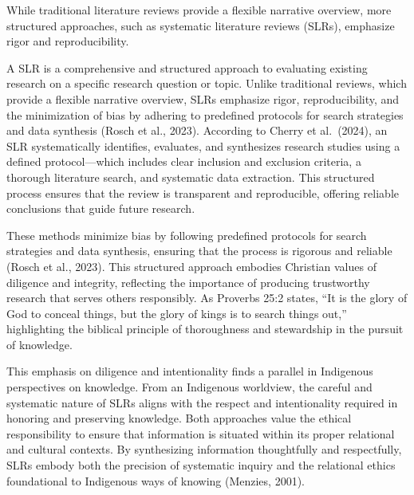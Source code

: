 \documentclass[
  letterpaper,
  DIV=11,
  numbers=noendperiod]{scrreprt}
\begin{document}

While traditional literature reviews provide a flexible narrative
overview, more structured approaches, such as systematic literature
reviews (SLRs), emphasize rigor and reproducibility.

A SLR is a comprehensive and structured approach to evaluating existing
research on a specific research question or topic. Unlike traditional
reviews, which provide a flexible narrative overview, SLRs emphasize
rigor, reproducibility, and the minimization of bias by adhering to
predefined protocols for search strategies and data synthesis (Rosch et
al., 2023). According to Cherry et al.~(2024), an SLR systematically
identifies, evaluates, and synthesizes research studies using a defined
protocol---which includes clear inclusion and exclusion criteria, a
thorough literature search, and systematic data extraction. This
structured process ensures that the review is transparent and
reproducible, offering reliable conclusions that guide future research.

These methods minimize bias by following predefined protocols for search
strategies and data synthesis, ensuring that the process is rigorous and
reliable (Rosch et al., 2023). This structured approach embodies
Christian values of diligence and integrity, reflecting the importance
of producing trustworthy research that serves others responsibly. As
Proverbs 25:2 states, ``It is the glory of God to conceal things, but
the glory of kings is to search things out,'' highlighting the biblical
principle of thoroughness and stewardship in the pursuit of knowledge.

This emphasis on diligence and intentionality finds a parallel in
Indigenous perspectives on knowledge. From an Indigenous worldview, the
careful and systematic nature of SLRs aligns with the respect and
intentionality required in honoring and preserving knowledge. Both
approaches value the ethical responsibility to ensure that information
is situated within its proper relational and cultural contexts. By
synthesizing information thoughtfully and respectfully, SLRs embody both
the precision of systematic inquiry and the relational ethics
foundational to Indigenous ways of knowing (Menzies, 2001).
\end{document}
